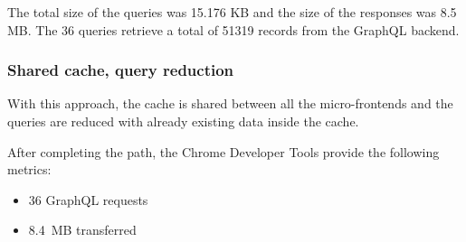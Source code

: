 \ifshowUnusedContent



\fi

The total size of the queries was 15.176 KB and the size of the responses was 8.5 MB. The 36 queries retrieve a total of 51319 records from the GraphQL backend.

\subsubsection{Shared cache, query reduction}

With this approach, the cache is shared between all the micro-frontends and the queries are reduced with already existing data inside the cache.

After completing the path, the Chrome Developer Tools provide the following metrics:

\begin{itemize}
    \item 36 GraphQL requests
    \item 8.4 MB transferred
\end{itemize}

\ifshowUnusedContent

